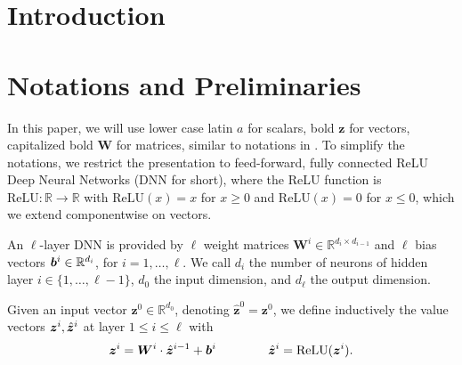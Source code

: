 \documentclass[runningheads]{llncs}
\newcommand{\ReLU}{\mathrm{ReLU}}
\begin{document}
\begin{abstract}
		
	\end{abstract}
	

\section{Introduction}







%


\section{Notations and Preliminaries}

In this paper, we will use lower case latin $a$ for scalars, bold $\boldsymbol{z}$ for vectors, 
capitalized bold $\boldsymbol{W}$ for matrices, similar to notations in \cite{crown}.
To simplify the notations, we restrict the presentation to feed-forward, 
fully connected ReLU Deep Neural Networks (DNN for short), where the ReLU function is $\ReLU : \mathbb{R} \rightarrow \mathbb{R}$ with
$\ReLU(x)=x$ for $x \geq 0$ and $\ReLU(x)=0$ for $x \leq 0$, which we extend componentwise on vectors.




An $\ell$-layer DNN is provided by $\ell$ weight matrices 
$\boldsymbol{W}^i \in \mathbb{R}^{d_i\times d_{i-1}}$
and $\ell$ bias vectors ${\bm{b}}^i \in \mathbb{R}^{d_i}$, for $i=1, \ldots, \ell$.
We call $d_i$ the number of neurons of hidden layer $i \in \{1, \ldots, \ell-1\}$,
$d_0$ the input dimension, and $d_\ell$ the output dimension.

Given an input vector $\boldsymbol{z}^0 \in \mathbb{R}^{d_0}$, 
denoting $\hat{\boldsymbol{z}}^{0}={\boldsymbol{z}}^0$, we define inductively the value vectors $\boldsymbol{z}^i,\hat{{\bm{z}}}^i$ at layer $1 \leq i \leq \ell$ with
\begin{align}
	\boldsymbol{z}^{i} = \boldsymbol{W}^i\cdot \hat{\boldsymbol{z}}^{i-1}+ \vb^i \qquad \, \qquad
	\hat{\boldsymbol{z}}^{i} = \ReLU({\boldsymbol{z}}^i).
\end{align} 
\end{document}
